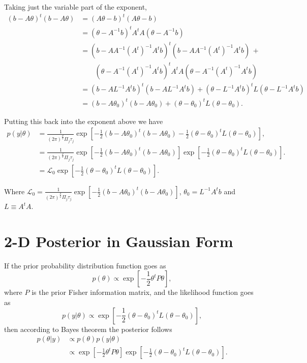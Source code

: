 \documentclass[a4paper,11pt,twoside]{article}
\begin{document}
Taking just the variable part of the exponent,
\begin{align*}
	(b - A\theta)^t(b-A\theta) &= (A\theta - b)^t(A\theta - b)
	\\ &= (\theta - A^{-1}b)^tA^tA(\theta - A^{-1}b)
	\\ &= (b - AA^{-1}(A^t)^{-1}A^tb)^t(b - AA^{-1}(A^t)^{-1}A^tb) \, + \\ & \qquad (\theta - A^{-1} (A^t)^{-1} A^t b)^t A^t A(\theta - A^{-1} (A^t)^{-1} A^t b)
	\\ &= (b - A L^{-1} A^t b)^t (b - A L^{-1} A^t b) + (\theta - L^{-1} A^t b)^t L (\theta - L^{-1} A^t b)
	\\ &= (b - A \theta_0)^t (b - A \theta_0) + (\theta - \theta_0)^t L (\theta - \theta_0).
\end{align*}

Putting this back into the exponent above we have
\begin{align*}
	p(y|\theta) &= \frac{1}{(2\pi)^{\frac{d}{2}}\Pi_j\tau_j} \exp\left[-\frac{1}{2}(b - A \theta_0)^t (b - A \theta_0) -\frac{1}{2}(\theta - \theta_0)^t L (\theta - \theta_0)\right],
	\\ &= \frac{1}{(2\pi)^{\frac{d}{2}}\Pi_j\tau_j} \exp\left[-\frac{1}{2}(b - A \theta_0)^t (b - A \theta_0)\right] \exp\left[-\frac{1}{2} (\theta - \theta_0)^t L (\theta - \theta_0)\right].
	\\ &= \mathcal{L}_0 \exp\left[-\frac{1}{2} (\theta - \theta_0)^t L (\theta - \theta_0)\right].
\end{align*}

Where $\mathcal{L}_0 = \frac{1}{(2\pi)^{\frac{d}{2}}\Pi_j\tau_j} \exp\left[-\frac{1}{2}(b - A \theta_0)^t (b - A \theta_0)\right]$, $\theta_0 = L^{-1} A^t b$ and $L \equiv A^tA$.

\section{2-D Posterior in Gaussian Form}
\label{sec:2dposterior}

If the prior probability distribution function goes as
\begin{equation*}
	p(\theta) \propto \exp \left[ -\frac{1}{2} \theta^t P \theta \right],
\end{equation*}
where $P$ is the prior Fisher information matrix, and the likelihood function goes as
\begin{equation*}
	p(y|\theta) \propto \exp\left[-\frac{1}{2} (\theta - \theta_0)^t L (\theta - \theta_0)\right],
\end{equation*}
then according to Bayes theorem the posterior follows
\begin{align*}
	p(\theta|y) & \propto p(\theta) p(y|\theta) 
	\\ & \propto \exp \left[ -\frac{1}{2} \theta^t P \theta \right] \exp\left[-\frac{1}{2} (\theta - \theta_0)^t L (\theta - \theta_0)\right].
\end{align*}
\end{document}
